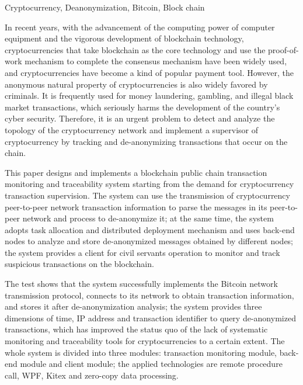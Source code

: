 \documentclass[supercite]{HustGraduPaper}
\theoremstyle{definition}
\begin{document}
\begin{enabstract}{Cryptocurrency, Deanonymization, Bitcoin, Block chain}

  In recent years, with the advancement of the computing power of computer equipment and the vigorous development of blockchain technology, cryptocurrencies that take blockchain as the core technology and use the proof-of-work mechanism to complete the consensus mechanism have been widely used, and cryptocurrencies have become a kind of popular payment tool. However, the anonymous natural property of cryptocurrencies is also widely favored by criminals. It is frequently used for money laundering, gambling, and illegal black market transactions, which seriously harms the development of the country's cyber security. Therefore, it is an urgent problem to detect and analyze the topology of the cryptocurrency network and implement a supervisor of cryptocurrency by tracking and de-anonymizing transactions that occur on the chain.

  This paper designs and implements a blockchain public chain transaction monitoring and traceability system starting from the demand for cryptocurrency transaction supervision. The system can use the transmission of cryptocurrency peer-to-peer network transaction information to parse the messages in its peer-to-peer network and process to de-anonymize it; at the same time, the system adopts task allocation and distributed deployment mechanism and uses back-end nodes to analyze and store de-anonymized messages obtained by different nodes; the system provides a client for civil servants operation to monitor and track suspicious transactions on the blockchain.

  The test shows that the system successfully implements the Bitcoin network transmission protocol, connects to its network to obtain transaction information, and stores it after de-anonymization analysis; the system provides three dimensions of time, IP address and transaction identifier to query de-anonymized transactions, which has improved the status quo of the lack of systematic monitoring and traceability tools for cryptocurrencies to a certain extent. The whole system is divided into three modules: transaction monitoring module, back-end module and client module; the applied technologies are remote procedure call, WPF, Kitex and zero-copy data processing.

\end{enabstract}

\tableofcontents[level=2]
\clearpage
\end{document}

